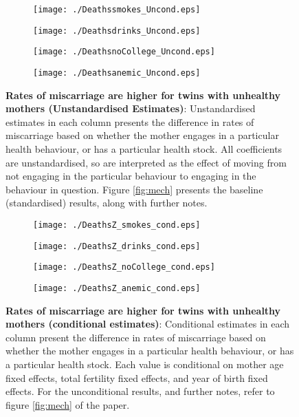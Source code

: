 \documentclass{nature}
\begin{document}
\begin{linenumbers}
\begin{spacing}{1}
\begin{figure}[htpb!]
\begin{subfigure}{.5\textwidth}
  \texttt{[image: ./Deathssmokes\_Uncond.eps]}
\end{subfigure}%
\begin{subfigure}{.5\textwidth}
  \texttt{[image: ./Deathsdrinks\_Uncond.eps]}
\end{subfigure}
\begin{subfigure}{.5\textwidth}
  \texttt{[image: ./DeathsnoCollege\_Uncond.eps]}
\end{subfigure}%
\begin{subfigure}{.5\textwidth}
  \texttt{[image: ./Deathsanemic\_Uncond.eps]}
\end{subfigure}
\vspace{5mm}
\caption{\textbf{Rates of miscarriage are higher for twins with unhealthy mothers (Unstandardised Estimates)}: {\footnotesize Unstandardised estimates in each column presents the difference in rates of miscarriage based on whether the mother engages in a particular health behaviour, or has a particular health stock.  All coefficients are unstandardised, so are interpreted as the effect of moving from not engaging in the particular behaviour to engaging in the behaviour in question. Figure \ref{fig:mech} presents the baseline (standardised) results, along with further notes.}}
\label{fig:miscarriageUnstand}
\end{figure}

\begin{figure}[htpb!]
\begin{subfigure}{.5\textwidth}
  \texttt{[image: ./DeathsZ\_smokes\_cond.eps]}
\end{subfigure}%
\begin{subfigure}{.5\textwidth}
  \texttt{[image: ./DeathsZ\_drinks\_cond.eps]}
\end{subfigure}
\begin{subfigure}{.5\textwidth}
  \texttt{[image: ./DeathsZ\_noCollege\_cond.eps]}
\end{subfigure}%
\begin{subfigure}{.5\textwidth}
  \texttt{[image: ./DeathsZ\_anemic\_cond.eps]}
\end{subfigure}
\vspace{5mm}
\caption{\textbf{Rates of miscarriage are higher for twins with unhealthy mothers (conditional estimates)}: {\footnotesize Conditional estimates in each column present the difference in rates of miscarriage based on whether the mother engages in a particular health behaviour, or has a particular health stock.  Each value is conditional on mother age fixed effects, total fertility fixed effects, and year of birth fixed effects.  For the unconditional results, and further notes, refer to figure \ref{fig:mech} of the paper.}}
\label{fig:miscarriageCond}
\end{figure}


\end{spacing}
\end{linenumbers}
\end{document}
